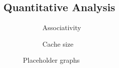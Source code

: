 \subsection{Quantitative Analysis}

\begin{figure}[ht]
    \centering
    \begin{subfigure}[b]{0.45\textwidth}
        \centering
        \caption{Associativity}
        \label{fig:associativity}
    \end{subfigure}
    \hfill
    \begin{subfigure}[b]{0.45\textwidth}
        \centering
        \caption{Cache size}
        \label{fig:cache_size}
    \end{subfigure}
    \hfill
    \caption{Placeholder graphs}
    \label{fig:placeholder}
\end{figure}
